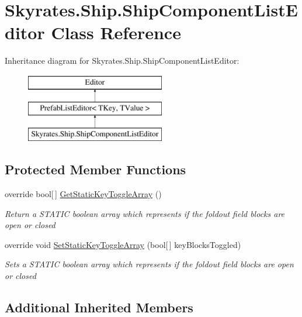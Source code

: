 \hypertarget{class_skyrates_1_1_ship_1_1_ship_component_list_editor}{\section{Skyrates.\-Ship.\-Ship\-Component\-List\-Editor Class Reference}
\label{class_skyrates_1_1_ship_1_1_ship_component_list_editor}
}
Inheritance diagram for Skyrates.\-Ship.\-Ship\-Component\-List\-Editor\-:\begin{figure}[H]
\begin{center}
\leavevmode
\includegraphics[height=3.000000cm]{class_skyrates_1_1_ship_1_1_ship_component_list_editor}
\end{center}
\end{figure}
\subsection*{Protected Member Functions}
\begin{DoxyCompactItemize}
\item 
override bool\mbox{[}$\,$\mbox{]} \hyperlink{class_skyrates_1_1_ship_1_1_ship_component_list_editor_a0bcf5fdf968a72678d202ac5585088a5}{Get\-Static\-Key\-Toggle\-Array} ()
\begin{DoxyCompactList}\small\item\em Return a S\-T\-A\-T\-I\-C boolean array which represents if the foldout field blocks are open or closed \end{DoxyCompactList}\item 
override void \hyperlink{class_skyrates_1_1_ship_1_1_ship_component_list_editor_a3fd87a0b9c93edce8d116866ef269170}{Set\-Static\-Key\-Toggle\-Array} (bool\mbox{[}$\,$\mbox{]} key\-Blocks\-Toggled)
\begin{DoxyCompactList}\small\item\em Sets a S\-T\-A\-T\-I\-C boolean array which represents if the foldout field blocks are open or closed \end{DoxyCompactList}\end{DoxyCompactItemize}
\subsection*{Additional Inherited Members}


